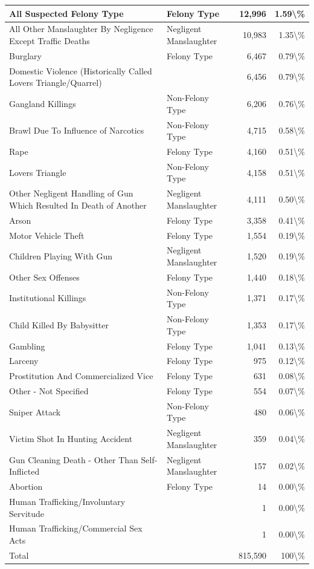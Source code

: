 \documentclass[
]{krantz}
\begin{document}
\begin{longtable}[t]{l|l|r|r}
\hline
All Suspected Felony Type & Felony Type & 12,996 & 1.59\textbackslash{}\%\\
\hline
All Other Manslaughter By Negligence Except Traffic Deaths & Negligent Manslaughter & 10,983 & 1.35\textbackslash{}\%\\
\hline
Burglary & Felony Type & 6,467 & 0.79\textbackslash{}\%\\
\hline
Domestic Violence (Historically Called Lovers Triangle/Quarrel) &  & 6,456 & 0.79\textbackslash{}\%\\
\hline
Gangland Killings & Non-Felony Type & 6,206 & 0.76\textbackslash{}\%\\
\hline
Brawl Due To Influence of Narcotics & Non-Felony Type & 4,715 & 0.58\textbackslash{}\%\\
\hline
Rape & Felony Type & 4,160 & 0.51\textbackslash{}\%\\
\hline
Lovers Triangle & Non-Felony Type & 4,158 & 0.51\textbackslash{}\%\\
\hline
Other Negligent Handling of Gun Which Resulted In Death of Another & Negligent Manslaughter & 4,111 & 0.50\textbackslash{}\%\\
\hline
Arson & Felony Type & 3,358 & 0.41\textbackslash{}\%\\
\hline
Motor Vehicle Theft & Felony Type & 1,554 & 0.19\textbackslash{}\%\\
\hline
Children Playing With Gun & Negligent Manslaughter & 1,520 & 0.19\textbackslash{}\%\\
\hline
Other Sex Offenses & Felony Type & 1,440 & 0.18\textbackslash{}\%\\
\hline
Institutional Killings & Non-Felony Type & 1,371 & 0.17\textbackslash{}\%\\
\hline
Child Killed By Babysitter & Non-Felony Type & 1,353 & 0.17\textbackslash{}\%\\
\hline
Gambling & Felony Type & 1,041 & 0.13\textbackslash{}\%\\
\hline
Larceny & Felony Type & 975 & 0.12\textbackslash{}\%\\
\hline
Prostitution And Commercialized Vice & Felony Type & 631 & 0.08\textbackslash{}\%\\
\hline
Other - Not Specified & Felony Type & 554 & 0.07\textbackslash{}\%\\
\hline
Sniper Attack & Non-Felony Type & 480 & 0.06\textbackslash{}\%\\
\hline
Victim Shot In Hunting Accident & Negligent Manslaughter & 359 & 0.04\textbackslash{}\%\\
\hline
Gun Cleaning Death - Other Than Self-Inflicted & Negligent Manslaughter & 157 & 0.02\textbackslash{}\%\\
\hline
Abortion & Felony Type & 14 & 0.00\textbackslash{}\%\\
\hline
Human Trafficking/Involuntary Servitude &  & 1 & 0.00\textbackslash{}\%\\
\hline
Human Trafficking/Commercial Sex Acts &  & 1 & 0.00\textbackslash{}\%\\
\hline
Total &  & 815,590 & 100\textbackslash{}\%\\
\hline
\end{longtable}
\end{document}
